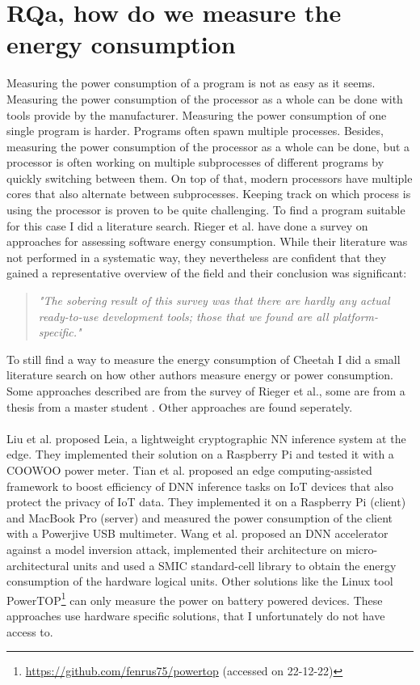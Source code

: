 \documentclass[../thesis.tex]{subfiles}
\begin{document}
\section{RQa, how do we measure the energy consumption}
Measuring the power consumption of a program is not as easy as it seems. Measuring the power consumption of the processor as a whole can be done with tools provide by the manufacturer. Measuring the power consumption of one single program is harder. Programs often spawn multiple processes. Besides, measuring the power consumption of the processor as a whole can be done, but a processor is often working on multiple subprocesses of different programs by quickly switching between them. On top of that, modern processors have multiple cores that also alternate between subprocesses. Keeping track on which process is using the processor is proven to be quite challenging. To find a program suitable for this case I did a literature search. Rieger et al. have done a survey on approaches for assessing software energy consumption. While their literature was not performed in a systematic way, they nevertheless are confident that they gained a representative overview of the field and their conclusion was significant:

\begin{quote}
    \emph{"The sobering result of this survey was that there are hardly any actual ready-to-use development tools; those that we found are all platform-specific."} \parencite[p. 24]{rieger2017}
\end{quote}

To still find a way to measure the energy consumption of Cheetah I did a small literature search on how other authors measure energy or power consumption. Some approaches described are from the survey of Rieger et al., some are from a thesis from a master student \parencite{strempel2021}. Other approaches are found seperately. \paragraph{}

Liu et al. \parencite*{liu2022} proposed Leia, a lightweight cryptographic NN inference system at the edge. They implemented their solution on a Raspberry Pi and tested it with a COOWOO power meter. Tian et al. \parencite*{tian2021} proposed an edge computing-assisted framework to boost efficiency of DNN inference tasks on IoT devices that also protect the privacy of IoT data. They implemented it on a Raspberry Pi (client) and MacBook Pro (server) and measured the power consumption of the client with a Powerjive USB multimeter. Wang et al. \parencite*{wang2019} proposed an DNN accelerator against a model inversion attack, implemented their architecture on micro-architectural units and used a SMIC standard-cell library to obtain the energy consumption of the hardware logical units. Other solutions like the Linux tool PowerTOP\footnote{\url{https://github.com/fenrus75/powertop} (accessed on 22-12-22)} can only measure the power on battery powered devices. These approaches use hardware specific solutions, that I unfortunately do not have access to.
\end{document}
